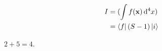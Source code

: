 \documentclass[12pt]{article}
\begin{document}










\begin{align}
  I &= (\int f(\vb{x}) \dd[4]{x}) \\
    &= \bra{f} (S-1) \ket{i}
\end{align}


$2 + 5 = 4$.
\end{document}
